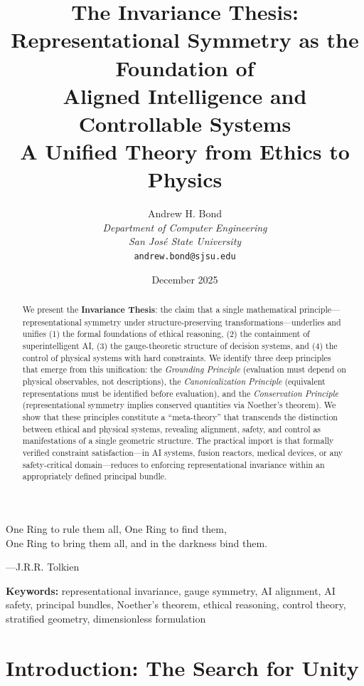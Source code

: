\documentclass[12pt]{article}
\title{The Invariance Thesis:\\
Representational Symmetry as the Foundation of\\
Aligned Intelligence and Controllable Systems\\[0.5em]
\large A Unified Theory from Ethics to Physics}
\author{Andrew H. Bond\\
\textit{Department of Computer Engineering}\\
\textit{San Jos\'{e} State University}\\
\texttt{andrew.bond@sjsu.edu}}
\date{December 2025}
\begin{document}
\maketitle

\begin{flushright}
\begin{minipage}{0.5\textwidth}
One Ring to rule them all, One Ring to find them,\\
One Ring to bring them all, and in the darkness bind them.

\medskip
\hfill ---J.R.R. Tolkien
\end{minipage}
\end{flushright}

\begin{abstract}
We present the \textbf{Invariance Thesis}: the claim that a single mathematical principle---representational symmetry under structure-preserving transformations---underlies and unifies (1) the formal foundations of ethical reasoning, (2) the containment of superintelligent AI, (3) the gauge-theoretic structure of decision systems, and (4) the control of physical systems with hard constraints. We identify three deep principles that emerge from this unification: the \textit{Grounding Principle} (evaluation must depend on physical observables, not descriptions), the \textit{Canonicalization Principle} (equivalent representations must be identified before evaluation), and the \textit{Conservation Principle} (representational symmetry implies conserved quantities via Noether's theorem). We show that these principles constitute a ``meta-theory'' that transcends the distinction between ethical and physical systems, revealing alignment, safety, and control as manifestations of a single geometric structure. The practical import is that formally verified constraint satisfaction---in AI systems, fusion reactors, medical devices, or any safety-critical domain---reduces to enforcing representational invariance within an appropriately defined principal bundle.
\end{abstract}

\noindent\textbf{Keywords:} representational invariance, gauge symmetry, AI alignment, AI safety, principal bundles, Noether's theorem, ethical reasoning, control theory, stratified geometry, dimensionless formulation

\tableofcontents

\section{Introduction: The Search for Unity}
\end{document}
